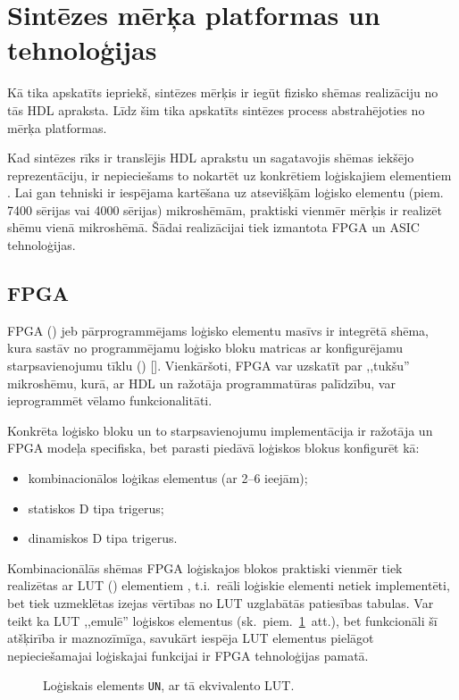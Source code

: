 \section{Sintēzes mērķa platformas un tehnoloģijas} \label{sec:synth}
Kā tika apskatīts iepriekš, sintēzes mērķis ir iegūt fizisko shēmas
realizāciju no tās HDL apraksta. Līdz šim tika apskatīts sintēzes process
abstrahējoties no mērķa platformas.

Kad sintēzes rīks ir translējis HDL aprakstu un sagatavojis shēmas 
iekšējo repre\-zen\-tā\-ciju, ir nepieciešams to nokartēt uz konkrētiem
loģiskajiem elementiem \cite[5.~lpp.]{HDL}.
Lai gan tehniski ir iespējama kartēšana uz
atsevišķām loģisko elementu (piem. 7400 sērijas vai 4000 sērijas)
mikroshēmām, praktiski vienmēr mērķis ir realizēt shēmu vienā
mikroshēmā. Šādai realizācijai tiek izmantota FPGA un ASIC tehnoloģijas.

\subsection{FPGA} \label{sec:fpga}
	FPGA () jeb pārprogrammējams
	loģisko elementu masīvs ir integrētā shēma, kura sastāv no
	programmējamu loģisko bloku matricas ar konfigurējamu starpsavienojumu
	tīklu () [\todo].
	Vienkāršoti, FPGA var uzskatīt par ,,tukšu'' mikroshēmu, kurā, ar HDL
	un ražotāja programmatūras palīdzību, var ieprogrammēt vēlamo
	funkcionalitāti.
	
	Konkrēta loģisko bloku un to starpsavienojumu implementācija ir ražotāja un 
	FPGA modeļa	specifiska\cite{SmartFusionFabric}\cite{Xilinx7}, 
	bet parasti piedāvā loģiskos blokus konfigurēt kā:
	\begin{itemize}
		\item kombinacionālos loģikas elementus (ar 2--6 ieejām);
		\item statiskos D tipa trigerus;
		\item dinamiskos D tipa trigerus.
	\end{itemize}
	
	Kombinacionālās shēmas FPGA loģiskajos blokos praktiski vienmēr tiek
	realizētas ar LUT () elementiem%
	\cite{SmartFusionFabric}\cite{Xilinx7}, t.i.~reāli loģiskie elementi
	netiek imple\-men\-tēti, bet tiek uzmeklētas izejas vērtības no LUT
	uzglabātās patiesības tabulas. Var teikt ka LUT ,,emulē'' loģiskos
	elementus (sk.~piem.~\ref{fig:and2lut}~att.),
	bet funkcionāli šī atšķirība ir maznozīmīga, savukārt
	iespēja LUT elementus pielāgot nepieciešamajai loģiskajai funkcijai ir 
	FPGA tehnoloģijas pamatā.
	\begin{figure}[hb]
		\centering
		{\ttfamily\small}
		\caption{Loģiskais elements \texttt{UN}, ar tā ekvivalento LUT.}
		\label{fig:and2lut}
	\end{figure}
	
